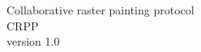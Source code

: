 \documentclass[12pt,oneside,a4paper]{report}
\begin{document}
\thispagestyle{empty}
\begin{center}

{\Huge Collaborative raster painting protocol}\\[50pt]

{\Huge CRPP}\\[100pt]

{\Large version 1.0}

\end{center}
\newpage

\tableofcontents
\newpage








\end{document}
